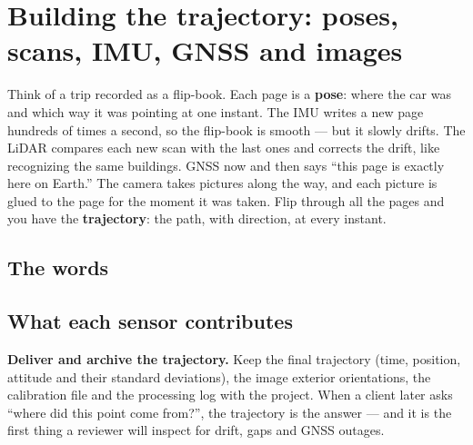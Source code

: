 \section{Building the trajectory: poses, scans, IMU, GNSS and images}

\begin{kid}
Think of a trip recorded as a flip-book. Each page is a \textbf{pose}: where the car was and which way it was pointing at one instant. The IMU writes a new page hundreds of times a second, so the flip-book is smooth --- but it slowly drifts. The LiDAR compares each new scan with the last ones and corrects the drift, like recognizing the same buildings. GNSS now and then says ``this page is exactly here on Earth.'' The camera takes pictures along the way, and each picture is glued to the page for the moment it was taken. Flip through all the pages and you have the \textbf{trajectory}: the path, with direction, at every instant.
\end{kid}

\subsection*{The words}


\subsection*{What each sensor contributes}



\begin{tip}
\textbf{Deliver and archive the trajectory.} Keep the final trajectory (time, position, attitude and their standard deviations), the image exterior orientations, the calibration file and the processing log with the project. When a client later asks ``where did this point come from?'', the trajectory is the answer --- and it is the first thing a reviewer will inspect for drift, gaps and GNSS outages.
\end{tip}
